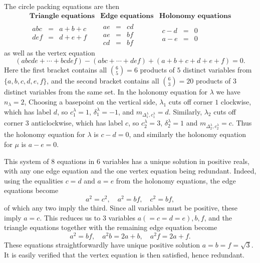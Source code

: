 \documentclass[12pt]{amsart}
\numberwithin{equation}{section}
\theoremstyle{named}
\begin{document}
The circle packing equations are then
\[
\begin{array}{c|c|c}
\textbf{Triangle equations} & \textbf{Edge equations} & \textbf{Holonomy equations} \\
\hline
\begin{array}{rcl}
abc &=& a+b+c \\
def &=& d+e+f \\
\end{array}
&
\begin{array}{rcl}
ae &=& cd \\
ae &=& bf \\
cd &=& bf 
\end{array}
&
\begin{array}{rcl}
c-d &=& 0 \\
a-e &=& 0
\end{array}
\end{array}
\]
as well as the vertex equation
\[
\left( abcde+\cdots 
+bcdef \right)
- \left( abc+\cdots+def \right)
+ \left( a+b+c+d+e+f \right) = 0.
\]
Here the first bracket contains all $\binom{6}{5}=6$ products of $5$ distinct variables from $\{a,b,c,d,e,f\}$, and the second bracket contains all $\binom{6}{3} = 20$ products of $3$ distinct variables from the same set.
In the holonomy equation for $\lambda$ we have $n_\lambda = 2$, Choosing a basepoint on the vertical side, $\lambda_1$ cuts off corner $1$ clockwise, which has label $d$, so $c_1^\lambda = 1$, $\delta_1^\lambda = -1$, and $m_{\Delta_1^\lambda, c_1^\lambda} = d$. Similarly, $\lambda_2$ cuts off corner $3$ anticlockwise, which has label $c$, so $c_2^\lambda = 3$, $\delta_2^\lambda = 1$ and $m_{\Delta_2^\lambda, c_2^\lambda} = c$. Thus the holonomy equation for $\lambda$ is $c-d=0$, and similarly the holonomy equation for $\mu$ is $a-e=0$.

This system of $8$ equations in $6$ variables has a unique solution in positive reals, with any one edge equation and the one vertex equation being redundant. Indeed, using the equalities $c=d$ and $a=e$ from the holonomy equations, the edge equations become
\[
a^2 = c^2, \quad
a^2 = bf, \quad
c^2 = bf,
\]
of which any two imply the third. Since all variables must be positive, these imply $a=c$. This reduces us to $3$ variables $a(=c=d=e),b,f$, and the triangle equations together with the remaining edge equation become
\[
a^2 = bf, \quad
a^2 b = 2a+b, \quad
a^2 f = 2a+f.
\]
These equations straightforwardly have unique positive solution $a=b=f=\sqrt{3}$. It is easily verified that the vertex equation is then satisfied, hence redundant.
\end{document}

